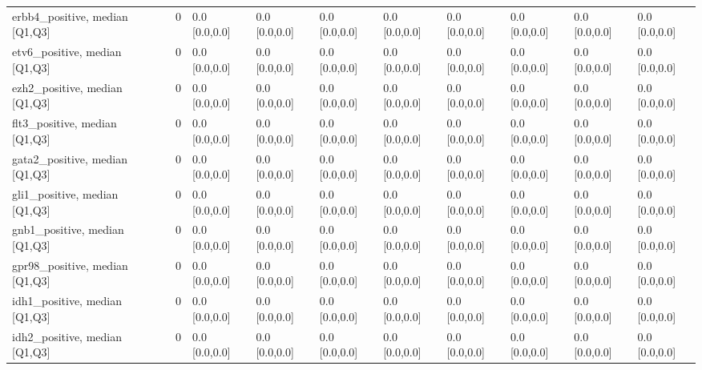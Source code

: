 \begin{tabular}{lllllllllll}
erbb4\_positive, median [Q1,Q3] &    &                    0 &       0.0 [0.0,0.0] &      0.0 [0.0,0.0] &        0.0 [0.0,0.0] &       0.0 [0.0,0.0] &     0.0 [0.0,0.0] &     0.0 [0.0,0.0] &       0.0 [0.0,0.0] &        0.0 [0.0,0.0] \\
etv6\_positive, median [Q1,Q3] &    &                    0 &       0.0 [0.0,0.0] &      0.0 [0.0,0.0] &        0.0 [0.0,0.0] &       0.0 [0.0,0.0] &     0.0 [0.0,0.0] &     0.0 [0.0,0.0] &       0.0 [0.0,0.0] &        0.0 [0.0,0.0] \\
ezh2\_positive, median [Q1,Q3] &    &                    0 &       0.0 [0.0,0.0] &      0.0 [0.0,0.0] &        0.0 [0.0,0.0] &       0.0 [0.0,0.0] &     0.0 [0.0,0.0] &     0.0 [0.0,0.0] &       0.0 [0.0,0.0] &        0.0 [0.0,0.0] \\
flt3\_positive, median [Q1,Q3] &    &                    0 &       0.0 [0.0,0.0] &      0.0 [0.0,0.0] &        0.0 [0.0,0.0] &       0.0 [0.0,0.0] &     0.0 [0.0,0.0] &     0.0 [0.0,0.0] &       0.0 [0.0,0.0] &        0.0 [0.0,0.0] \\
gata2\_positive, median [Q1,Q3] &    &                    0 &       0.0 [0.0,0.0] &      0.0 [0.0,0.0] &        0.0 [0.0,0.0] &       0.0 [0.0,0.0] &     0.0 [0.0,0.0] &     0.0 [0.0,0.0] &       0.0 [0.0,0.0] &        0.0 [0.0,0.0] \\
gli1\_positive, median [Q1,Q3] &    &                    0 &       0.0 [0.0,0.0] &      0.0 [0.0,0.0] &        0.0 [0.0,0.0] &       0.0 [0.0,0.0] &     0.0 [0.0,0.0] &     0.0 [0.0,0.0] &       0.0 [0.0,0.0] &        0.0 [0.0,0.0] \\
gnb1\_positive, median [Q1,Q3] &    &                    0 &       0.0 [0.0,0.0] &      0.0 [0.0,0.0] &        0.0 [0.0,0.0] &       0.0 [0.0,0.0] &     0.0 [0.0,0.0] &     0.0 [0.0,0.0] &       0.0 [0.0,0.0] &        0.0 [0.0,0.0] \\
gpr98\_positive, median [Q1,Q3] &    &                    0 &       0.0 [0.0,0.0] &      0.0 [0.0,0.0] &        0.0 [0.0,0.0] &       0.0 [0.0,0.0] &     0.0 [0.0,0.0] &     0.0 [0.0,0.0] &       0.0 [0.0,0.0] &        0.0 [0.0,0.0] \\
idh1\_positive, median [Q1,Q3] &    &                    0 &       0.0 [0.0,0.0] &      0.0 [0.0,0.0] &        0.0 [0.0,0.0] &       0.0 [0.0,0.0] &     0.0 [0.0,0.0] &     0.0 [0.0,0.0] &       0.0 [0.0,0.0] &        0.0 [0.0,0.0] \\
idh2\_positive, median [Q1,Q3] &    &                    0 &       0.0 [0.0,0.0] &      0.0 [0.0,0.0] &        0.0 [0.0,0.0] &       0.0 [0.0,0.0] &     0.0 [0.0,0.0] &     0.0 [0.0,0.0] &       0.0 [0.0,0.0] &        0.0 [0.0,0.0] \\

\end{tabular}
